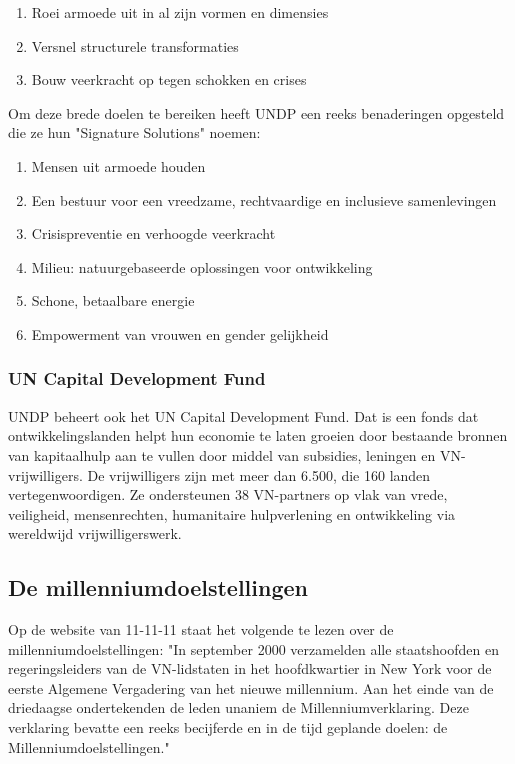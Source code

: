 \begin{enumerate}
\item Roei armoede uit in al zijn vormen en dimensies
\item Versnel structurele transformaties
\item Bouw veerkracht op tegen schokken en crises
\end{enumerate}

Om deze brede doelen te bereiken heeft UNDP een reeks benaderingen opgesteld die ze hun "Signature Solutions" noemen:

\begin{enumerate}
	\item Mensen uit armoede houden
	\item Een bestuur voor een vreedzame, rechtvaardige en inclusieve samenlevingen
	\item Crisispreventie en verhoogde veerkracht
	\item Milieu: natuurgebaseerde oplossingen voor ontwikkeling
	\item Schone, betaalbare energie
	\item Empowerment van vrouwen en gender gelijkheid
\end{enumerate}

\subsubsection{UN Capital Development Fund}
UNDP beheert ook het UN Capital Development Fund. Dat is een fonds dat ontwikkelingslanden helpt hun economie te laten groeien door bestaande bronnen van kapitaalhulp aan te vullen door middel van subsidies, leningen en VN-vrijwilligers. De vrijwilligers zijn met meer dan 6.500, die 160 landen vertegenwoordigen. Ze ondersteunen 38 VN-partners op vlak van vrede, veiligheid, mensenrechten, humanitaire hulpverlening en ontwikkeling via wereldwijd vrijwilligerswerk.

\subsection{De millenniumdoelstellingen}
Op de website van 11-11-11 staat het volgende te lezen over de millenniumdoelstellingen: "In september 2000 verzamelden alle staatshoofden en regeringsleiders van de VN-lidstaten in het hoofdkwartier in New York voor de eerste Algemene Vergadering van het nieuwe millennium. Aan het einde van de driedaagse ondertekenden de leden unaniem de Millenniumverklaring. Deze verklaring bevatte een reeks becijferde en in de tijd geplande doelen: de Millenniumdoelstellingen." \autocite{11.11.112019}

